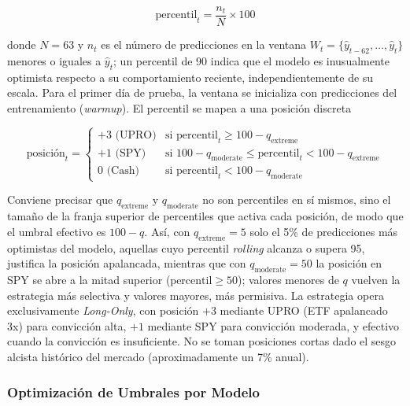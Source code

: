 ﻿\documentclass[11pt,a4paper]{article}
\begin{document}
\begin{equation}
\text{percentil}_t = \frac{n_t}{N} \times 100
\label{eq:percentile}
\end{equation}

\noindent donde $N = 63$ y $n_t$ es el n\'umero de predicciones en la ventana $W_t = \{\hat{y}_{t-62}, \ldots, \hat{y}_t\}$ menores o iguales a $\hat{y}_t$; un percentil de 90 indica que el modelo es inusualmente optimista respecto a su comportamiento reciente, independientemente de su escala. Para el primer d\'ia de prueba, la ventana se inicializa con predicciones del entrenamiento (\textit{warmup}). El percentil se mapea a una posici\'on discreta

\begin{equation}
\text{posici\'on}_t = \begin{cases}
+3 \text{ (UPRO)} & \text{si } \text{percentil}_t \geq 100 - q_{\text{extreme}} \\
+1 \text{ (SPY)} & \text{si } 100 - q_{\text{moderate}} \leq \text{percentil}_t < 100 - q_{\text{extreme}} \\
0 \text{ (Cash)} & \text{si } \text{percentil}_t < 100 - q_{\text{moderate}}
\end{cases}
\label{eq:position}
\end{equation}

\noindent Conviene precisar que $q_{\text{extreme}}$ y $q_{\text{moderate}}$ no son percentiles en s\'i mismos, sino el tama\~no de la franja superior de percentiles que activa cada posici\'on, de modo que el umbral efectivo es $100 - q$. As\'i, con $q_{\text{extreme}} = 5$ solo el 5\% de predicciones m\'as optimistas del modelo, aquellas cuyo percentil \textit{rolling} alcanza o supera 95, justifica la posici\'on apalancada, mientras que con $q_{\text{moderate}} = 50$ la posici\'on en SPY se abre a la mitad superior ($\text{percentil} \geq 50$); valores menores de $q$ vuelven la estrategia m\'as selectiva y valores mayores, m\'as permisiva. La estrategia opera exclusivamente \textit{Long-Only}, con posici\'on $+3$ mediante UPRO (ETF apalancado 3x) para convicci\'on alta, $+1$ mediante SPY para convicci\'on moderada, y efectivo cuando la convicci\'on es insuficiente. No se toman posiciones cortas dado el sesgo alcista hist\'orico del mercado (aproximadamente un 7\% anual).

\subsubsection{Optimizaci\'on de Umbrales por Modelo}
\label{subsec:meta_knn}
\end{document}
